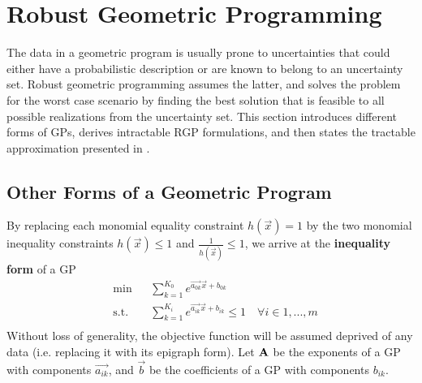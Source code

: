 \section{Robust Geometric Programming} \label{RGP}
The data in a geometric program is usually prone to uncertainties that could either have a probabilistic description or are known to belong to an uncertainty set. Robust geometric programming assumes the latter, and solves the problem for the worst case scenario by finding the best solution that is feasible to all possible realizations from the uncertainty set. This section introduces different forms of GPs, derives intractable RGP formulations, and then states the tractable approximation presented in \cite{hsiung_kim_boyd_2007}.
\subsection{Other Forms of a Geometric Program}

By replacing each monomial equality constraint $h\left(\vec{x}\right) = 1$ by the two monomial inequality constraints $h\left(\vec{x}\right) \leq 1$ and $\frac{1}{h\left(\vec{x}\right)} \leq 1$, we arrive at the \textbf{inequality form} of a GP
\begin{equation}
\begin{aligned}
	& \min && \textstyle{\sum}_{k=1}^{K_0}e^{\vec{a_{0k}}\vec{x} + b_{0k}} \\
	& \text{s.t.} && \textstyle{\sum}_{k=1}^{K_i}e^{\vec{a_{ik}}\vec{x} + b_{ik}} \leq 1 \quad \forall i \in 1,...,m\\
\end{aligned}
\label{GP_inequality}
\end{equation}
Without loss of generality, the objective function will be assumed deprived of any data (i.e. replacing it with its epigraph form). Let $\mathbf{A}$ be the exponents of a GP with components $\vec{a_{ik}}$, and $\vec{b}$ be the coefficients of a GP with components $b_{ik}$.
%

